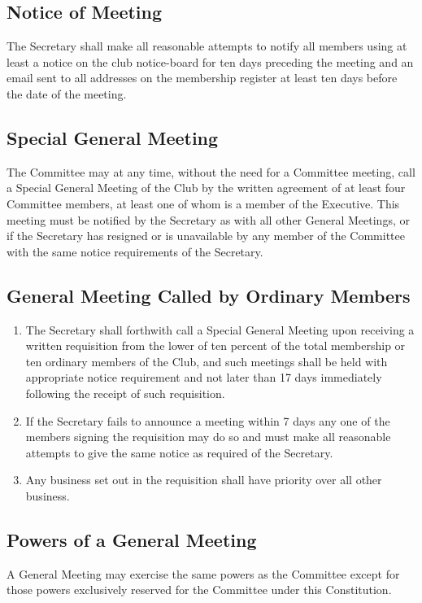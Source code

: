\documentclass[11pt]{article} %
\begin{document}
\subsection{Notice of Meeting}
The Secretary shall make all reasonable attempts to notify all members using at least a notice on the club notice-board for ten days preceding the meeting and an email sent to all addresses on the membership register at least ten days before the date of the meeting.
\subsection{Special General Meeting}
The Committee may at any time, without the need for a Committee meeting, call a Special General Meeting of the Club by the written agreement of at least four Committee members, at least one of whom is a member of the Executive. This meeting must be notified by the Secretary as with all other General Meetings, or if the Secretary has resigned or is unavailable by any member of the Committee with the same notice requirements of the Secretary.\\

\subsection{General Meeting Called by Ordinary Members}
\begin{enumerate}
	\item The Secretary shall forthwith call a Special General Meeting upon receiving a written requisition from the lower of ten percent of the total membership or ten ordinary members of the Club, and such meetings shall be held with appropriate notice requirement and not later than 17 days immediately following the receipt of such requisition.
	\item If the Secretary fails to announce a meeting within 7 days any one of the members signing the requisition may do so and must make all reasonable attempts to give the same notice as required of the Secretary.
	\item Any business set out in the requisition shall have priority over all other business.
\end{enumerate}

\subsection{Powers of a General Meeting}
A General Meeting may exercise the same powers as the Committee except for those powers exclusively reserved for the Committee under this Constitution.
\end{document}
